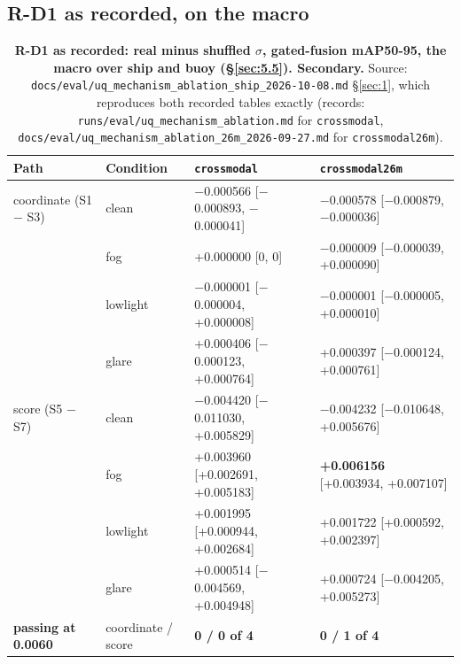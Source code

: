 \documentclass[10pt]{article}
\begin{document}
\subsection{R-D1 as recorded, on the macro}\label{app:H.1}
\begin{table}[htbp]
\centering
\small
\caption{\textbf{R-D1 as recorded: real minus shuffled $\sigma$, gated-fusion mAP50-95, the macro over ship and buoy (\S\ref{sec:5.5}). Secondary.} Source: \texttt{docs/\allowbreak{}eval/\allowbreak{}uq\_\allowbreak{}mechanism\_\allowbreak{}ablation\_\allowbreak{}ship\_\allowbreak{}2026-10-08.md} \S\ref{sec:1}, which reproduces both recorded tables exactly (records: \texttt{runs/\allowbreak{}eval/\allowbreak{}uq\_\allowbreak{}mechanism\_\allowbreak{}ablation.md} for \texttt{crossmodal}, \texttt{docs/\allowbreak{}eval/\allowbreak{}uq\_\allowbreak{}mechanism\_\allowbreak{}ablation\_\allowbreak{}26m\_\allowbreak{}2026-09-27.md} for \texttt{crossmodal26m}).}
\label{tab:4c}
\begin{tabularx}{\linewidth}{ll>{\raggedright\arraybackslash}X>{\raggedright\arraybackslash}X}
\toprule
Path & Condition & \texttt{crossmodal} & \texttt{crossmodal26m} \\
\midrule
coordinate (S1 $-$ S3) & clean & $-$0.000566 [$-$0.000893, $-$0.000041] & $-$0.000578 [$-$0.000879, $-$0.000036] \\
 & fog & +0.000000 [0, 0] & $-$0.000009 [$-$0.000039, +0.000090] \\
 & lowlight & $-$0.000001 [$-$0.000004, +0.000008] & $-$0.000001 [$-$0.000005, +0.000010] \\
 & glare & +0.000406 [$-$0.000123, +0.000764] & +0.000397 [$-$0.000124, +0.000761] \\
score (S5 $-$ S7) & clean & $-$0.004420 [$-$0.011030, +0.005829] & $-$0.004232 [$-$0.010648, +0.005676] \\
 & fog & +0.003960 [+0.002691, +0.005183] & \textbf{+0.006156} [+0.003934, +0.007107] \\
 & lowlight & +0.001995 [+0.000944, +0.002684] & +0.001722 [+0.000592, +0.002397] \\
 & glare & +0.000514 [$-$0.004569, +0.004948] & +0.000724 [$-$0.004205, +0.005273] \\
\textbf{passing at 0.0060} & coordinate / score & \textbf{0 / 0 of 4} & \textbf{0 / 1 of 4} \\
\bottomrule
\end{tabularx}
\end{table}
\end{document}
